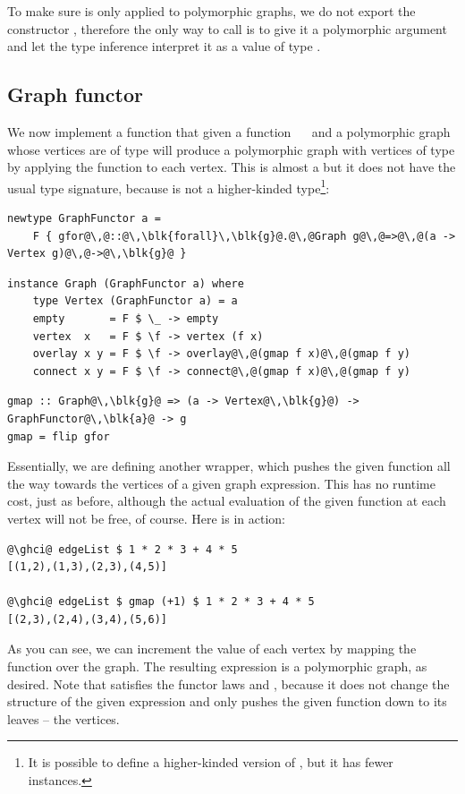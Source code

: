 To make sure  is only applied to polymorphic graphs, we do not export
the constructor , therefore the only way to call  is to give it a
polymorphic argument and let the type inference interpret it as a value of type
.

\subsection{Graph functor}\label{sub-functor}

We now implement a function  that given a function ~\hs{->}~
and a polymorphic graph whose vertices are of type  will produce a
polymorphic graph with vertices of type  by applying the function
to each vertex. This is almost a  but it does not have the usual
type signature, because  is not a higher-kinded type\footnote{It is
possible to define a higher-kinded version of , but it has
fewer instances.}:

\vspace{2mm}
\begin{verbatim}
newtype GraphFunctor a =
    F { gfor@\,@::@\,\blk{forall}\,\blk{g}@.@\,@Graph g@\,@=>@\,@(a -> Vertex g)@\,@->@\,\blk{g}@ }
\end{verbatim}
\vspace{1mm}
\begin{verbatim}
instance Graph (GraphFunctor a) where
    type Vertex (GraphFunctor a) = a
    empty       = F $ \_ -> empty
    vertex  x   = F $ \f -> vertex (f x)
    overlay x y = F $ \f -> overlay@\,@(gmap f x)@\,@(gmap f y)
    connect x y = F $ \f -> connect@\,@(gmap f x)@\,@(gmap f y)
\end{verbatim}
\vspace{1mm}
\begin{verbatim}
gmap :: Graph@\,\blk{g}@ => (a -> Vertex@\,\blk{g}@) -> GraphFunctor@\,\blk{a}@ -> g
gmap = flip gfor
\end{verbatim}

Essentially, we are defining another  wrapper, which pushes the
given function all the way towards the vertices of a given graph expression.
This has no runtime cost,
just as before, although the actual evaluation of the given function at each
vertex will not be free, of course. Here is  in action:

\begin{verbatim}
@\ghci@ edgeList $ 1 * 2 * 3 + 4 * 5
[(1,2),(1,3),(2,3),(4,5)]

@\ghci@ edgeList $ gmap (+1) $ 1 * 2 * 3 + 4 * 5
[(2,3),(2,4),(3,4),(5,6)]
\end{verbatim}
\vspace{-1mm}
As you can see, we can increment the value of each vertex by mapping the function
 over the graph. The resulting expression is a polymorphic graph, as desired.
Note that  satisfies the functor laws
 and , because
it does not change the structure of the given expression and only pushes
the given function down to its leaves -- the vertices.

